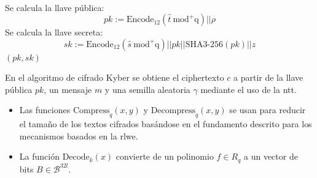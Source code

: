 \begin{algorithm}[H]
\begin{algorithmic}[1]
\begin{equation}
\begin{array}{l}
				\end{array} 	
		\end{equation}
		\State Se calcula la llave pública:
		\begin{equation}
			pk:=\text{Encode}_{12}(\hat{t}\ \text{mod}^{+}\text{q} )||\rho 
		\end{equation}
		\Statex {}
		\Statex {}
		\State Se calcula la llave secreta:
		\begin{equation}
			sk:=\text{Encode}_{12}(\hat{s}\ \text{mod}^{+}\text{q} )||pk||\text{SHA3-256}(pk)||z
		\end{equation}
		\Statex {}
		\State \Return $(pk,sk)$
	\end{algorithmic}
\end{algorithm}
\newpage

En el algoritmo de cifrado Kyber se obtiene el ciphertexto \(c\) a partir de la llave pública \(pk\), un mensaje \(m\) y una semilla aleatoria \(\gamma\) mediante el uso de la \gls{ntt}.
\begin{itemize}
	\item Las funciones $\text{Compress}_q(x,y)$ y $\text{Decompress}_q(x,y)$ se usan para reducir el tamaño de los textos cifrados basándose en el fundamento descrito para los mecanismos basados en la \gls{rlwe}. 
	\item La función $\text{Decode}_k(x)$  convierte de un polinomio \(f\in R_q\) a un vector de bits \(B\in\mathcal{B}^{32l}\).
\end{itemize}

